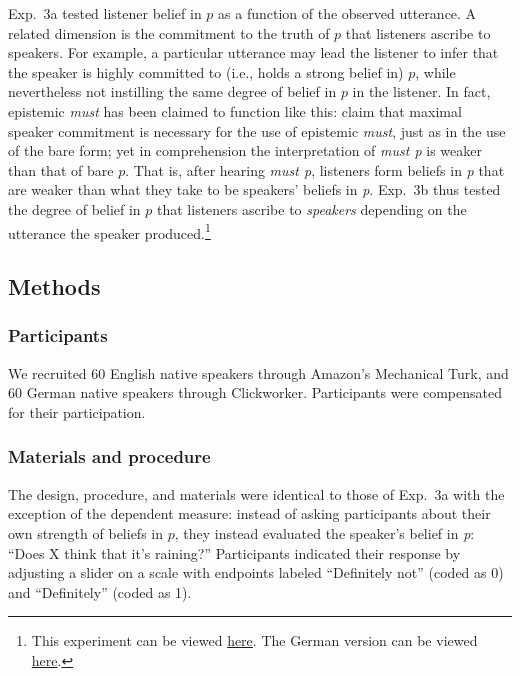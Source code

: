 \documentclass[11pt]{article}
\begin{document}
Exp.~3a tested listener belief in $p$ as a function of the observed utterance. A related dimension is the commitment to the truth of $p$ that listeners ascribe to speakers. For example, a particular utterance may lead the listener to infer that the speaker is highly committed to (i.e., holds a strong belief in) $p$, while nevertheless not instilling the same degree of belief in $p$ in the listener. In fact, epistemic \emph{must} has been claimed to function like this: \cite{vonfintelgillies2010} claim that maximal speaker commitment is necessary for the use of epistemic \emph{must}, just as in the use of the bare form; yet in comprehension the interpretation of \emph{must p} is weaker than that of bare $p$. That is, after hearing \emph{must p}, listeners form beliefs in \emph{p} that are weaker than what they take to be speakers' beliefs in \emph{p}.  Exp.~3b thus tested the degree of belief in $p$ that listeners ascribe to \emph{speakers} depending on the utterance the speaker produced.\footnote{This experiment can be viewed \href{http://stanford.edu/~jdegen/80_modals_comprehension_speakerbelief/modals.html}{here}. The German version can be viewed \href{http://web.stanford.edu/~jdegen/cgi-bin/1_dp_comprehension_speakerbelief/discourse_particles.html}{here}.}

\subsection{Methods}

\subsubsection{Participants}

We recruited 60 English native speakers through Amazon's Mechanical Turk, and 60 German native speakers through Clickworker. Participants were compensated for their participation.

\subsubsection{Materials and procedure}

The design, procedure, and materials were identical to those of Exp.~3a with the exception of the dependent measure: instead of asking participants about their own strength of beliefs in $p$, they instead evaluated the speaker's belief in \emph{p}: ``Does X think that it's raining?'' Participants indicated their response by adjusting a slider on a scale with endpoints labeled ``Definitely not'' (coded as 0) and ``Definitely'' (coded as 1). 
\end{document}
